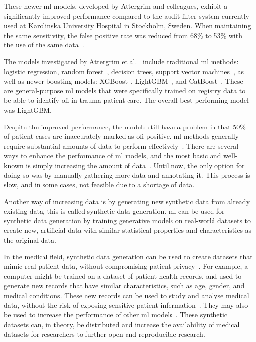 \documentclass[12pt, a4paper]{article}
\begin{document}
These newer \acrshort{ml} models, developed by Attergrim and colleagues, exhibit a significantly improved performance
compared to the audit filter system currently used at Karolinska University Hospital in Stockholm, Sweden. When
maintaining the same sensitivity, the false positive rate was reduced from 68\% to 53\% with the use of the same
data~\cite{attergrim_predicting_2023}.

The models investigated by Attergrim et al.~\cite{attergrim_predicting_2023} include traditional \acrshort{ml} methods:
logistic regression, random forest~\cite{breiman_random_2001}, decision trees, support vector
machines~\cite{cortes_support-vector_1995}, as well as newer boosting models: XGBoost~\cite{chen_xgboost_2016},
LightGBM~\cite{ke_lightgbm_2017}, and CatBoost~\cite{prokhorenkova_catboost_2018}. These are general-purpose
\acrshort{ml} models that were specifically trained on registry data to be able to identify \acrshort{ofi} in trauma
patient care. The overall best-performing model was LightGBM.

Despite the improved performance, the models still have a problem in that 50\% of patient cases are inaccurately marked
as \acrshort{ofi} positive. \acrshort{ml} methods generally require substantial amounts of data to perform
effectively~\cite{piccialli_survey_2021}. There are several ways to enhance the performance of \acrshort{ml} models,
and the most basic and well-known is simply increasing the amount of data~\cite{greener_guide_2022}. Until now, the
only option for doing so was by manually gathering more data and annotating it. This process is slow, and in some
cases, not feasible due to a shortage of data.

Another way of increasing data is by generating new synthetic data from already existing data, this is called synthetic
data generation. \acrshort{ml} can be used for synthetic data generation by training generative models on real-world
datasets to create new, artificial data with similar statistical properties and characteristics as the original
data.~\cite{chen_synthetic_2021}

In the medical field, synthetic data generation can be used to create datasets that mimic real patient data, without
compromising patient privacy~\cite{liu_ppgan_2019}. For example, a computer might be trained on a dataset of patient
health records, and used to generate new records that have similar characteristics, such as age, gender, and medical
conditions. These new records can be used to study and analyse medical data, without the risk of exposing sensitive
patient information~\cite{liu_ppgan_2019}. They may also be used to increase the performance of other \acrshort{ml}
models~\cite{chen_synthetic_2021}. These synthetic datasets can, in theory, be distributed and increase the
availability of medical datasets for researchers to further open and reproducible research.
\end{document}
